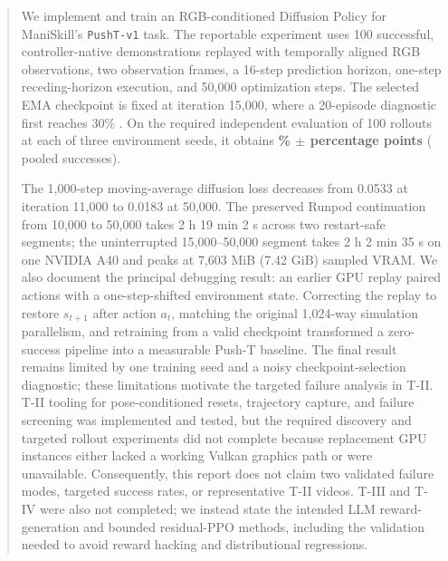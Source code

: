 \begin{abstract}
We implement and train an RGB-conditioned Diffusion Policy for ManiSkill's
\texttt{PushT-v1} task. The reportable experiment uses 100 successful, controller-native
demonstrations replayed with temporally aligned RGB observations, two observation frames, a
16-step prediction horizon, one-step receding-horizon execution, and 50,000 optimization steps.
The selected EMA checkpoint is fixed at iteration 15,000, where a 20-episode diagnostic first
reaches 30\% \successonce. On the required independent evaluation of 100 rollouts at each of
three environment seeds, it obtains \textbf{\timean\% $\pm$ \tistd{} percentage points}
(\tipooled{} pooled successes).

The 1,000-step moving-average diffusion loss decreases from 0.0533 at iteration 11,000 to 0.0183
at 50,000. The preserved Runpod continuation from 10,000 to 50,000 takes 2 h 19 min 2 s across
two restart-safe segments; the uninterrupted 15,000--50,000 segment takes 2 h 2 min 35 s on one
NVIDIA A40 and peaks at 7,603 MiB (7.42 GiB) sampled VRAM. We also document the principal
debugging result: an earlier GPU replay paired actions with a one-step-shifted environment state.
Correcting the replay to restore $s_{t+1}$ after action $a_t$, matching the original 1,024-way
simulation parallelism, and retraining from a valid checkpoint transformed a zero-success
pipeline into a measurable Push-T baseline. The final result remains limited by one training
seed and a noisy checkpoint-selection diagnostic; these limitations motivate the targeted
failure analysis in T-II. T-II tooling for pose-conditioned resets, trajectory capture, and
failure screening was implemented and tested, but the required discovery and targeted rollout
experiments did not complete because replacement GPU instances either lacked a working Vulkan
graphics path or were unavailable. Consequently, this report does not claim two validated failure
modes, targeted success rates, or representative T-II videos. T-III and T-IV were also not
completed; we instead state the intended LLM reward-generation and bounded residual-PPO methods,
including the validation needed to avoid reward hacking and distributional regressions.
\end{abstract}
